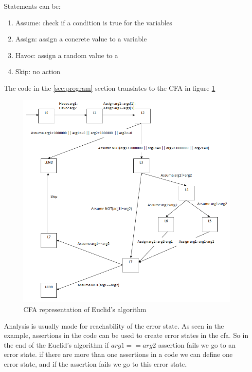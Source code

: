Statements can be:

\begin{enumerate}
	\item Assume: check if a condition is true for the variables
	\item Assign: assign a concrete value to a variable
	\item Havoc: assign a random value to a 
	\item Skip: no action
\end{enumerate}

The code in the \ref{sec:program} section translates to the CFA in figure \ref{fig:cfa}

\begin{figure} [!ht]
	\centering
	\includegraphics[width=170mm, keepaspectratio]{figures/cfa.png}
	\caption{\label{fig:cfa} CFA representation of Euclid's algorithm}
\end{figure}

Analysis is usually made for reachability of the error state. As seen in the example, assertions in the code can be used to create error states in the cfa. So in the end of the Euclid's algorithm if $arg1==arg2$ assertion fails we go to an error state. if there are more than one assertions in a code we can define one error state, and if the assertion fails we go to this error state.


